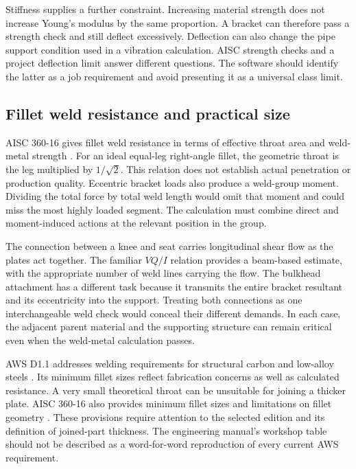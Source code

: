 Stiffness supplies a further constraint. Increasing material strength does not increase Young's modulus by the same proportion. A bracket can therefore pass a strength check and still deflect excessively. Deflection can also change the pipe support condition used in a vibration calculation. AISC strength checks and a project deflection limit answer different questions. The software should identify the latter as a job requirement and avoid presenting it as a universal class limit.

\subsection{Fillet weld resistance and practical size}
\label{sec:lit-weld-design}

AISC 360-16 gives fillet weld resistance in terms of effective throat area and weld-metal strength \cite{aisc2016}. For an ideal equal-leg right-angle fillet, the geometric throat is the leg multiplied by $1/\sqrt{2}$. This relation does not establish actual penetration or production quality. Eccentric bracket loads also produce a weld-group moment. Dividing the total force by total weld length would omit that moment and could miss the most highly loaded segment. The calculation must combine direct and moment-induced actions at the relevant position in the group.

The connection between a knee and seat carries longitudinal shear flow as the plates act together. The familiar $VQ/I$ relation provides a beam-based estimate, with the appropriate number of weld lines carrying the flow. The bulkhead attachment has a different task because it transmits the entire bracket resultant and its eccentricity into the support. Treating both connections as one interchangeable weld check would conceal their different demands. In each case, the adjacent parent material and the supporting structure can remain critical even when the weld-metal calculation passes.

AWS D1.1 addresses welding requirements for structural carbon and low-alloy steels \cite{awsD11}. Its minimum fillet sizes reflect fabrication concerns as well as calculated resistance. A very small theoretical throat can be unsuitable for joining a thicker plate. AISC 360-16 also provides minimum fillet sizes and limitations on fillet geometry \cite{aisc2016}. These provisions require attention to the selected edition and its definition of joined-part thickness. The engineering manual's workshop table should not be described as a word-for-word reproduction of every current AWS requirement.

